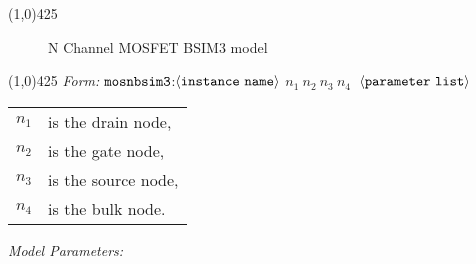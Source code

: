 \documentclass{article}
\begin{document}
\hrulefill\linethickness{0.5mm}\line(1,0){425} \normalsize
\newline
\begin{figure}[h]
\centerline{\epsfxsize=4in} \caption{N Channel MOSFET
BSIM3 model}
\end{figure}
\newline
\linethickness{0.5mm} \line(1,0){425}
\newline
\textit{Form:}
$\tt mosnbsim3$:$\langle \tt{instance\ name}\rangle$ $n_1\ n_2\
n_3\ n_4\ $ $\langle \tt{parameter\ list}\rangle$
\newline
\begin{tabular}{r l}
$n_1$ & is the drain node, \\
$n_2$ & is the gate node, \\
$n_3$ & is the source node, \\
$n_4$ & is the bulk node. \\
\end{tabular}
\newpage
\noindent\textit{Model Parameters:}
\newline
\end{document}
